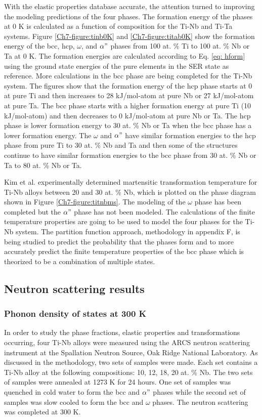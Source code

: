 With the elastic properties database accurate, the attention turned to improving the modeling predictions of the four phases. The formation energy of the phases at 0 K is calculated as a function of composition for the Ti-Nb and Ti-Ta systems. Figure \ref{Ch7-figure:tinb0K} and \ref{Ch7-figure:titab0K} show the formation energy of the bcc, hcp, $\omega$, and $\alpha"$ phases from 100 at. \% Ti to 100 at. \% Nb or Ta at 0 K. The formation energies are calculated according to Eq. \ref{eq: hform} using the ground state energies of the pure elements in the SER state as reference. More calculations in the bcc phase are being completed for the Ti-Nb system. The figures show that the formation energy of the hcp phase starts at 0 at pure Ti and then increases to 28 kJ/mol-atom at pure Nb or 27 kJ/mol-atom at pure Ta. The bcc phase starts with a higher formation energy at pure Ti (10 kJ/mol-atom) and then decreases to 0 kJ/mol-atom at pure Nb or Ta. The hcp phase is lower formation energy to 30 at. \% Nb or Ta when the bcc phase has a lower formation energy. The $\omega$ and $\alpha"$ have similar formation energies to the hcp phase from pure Ti to 30 at. \% Nb and Ta and then some of the structures continue to have similar formation energies to the bcc phase from 30 at. \% Nb or Ta to 80 at. \% Nb or Ta.

Kim et al.  \cite{Kim2006} experimentally determined martensitic transformation temperature for Ti-Nb alloys between 20 and 30 at. \% Nb, which is plotted on the phase diagram shown in Figure \ref{Ch7-figure:titnbms}. The modeling of the $\omega$ phase has been completed but the $\alpha"$ phase has not been modeled. The calculations of the finite temperature properties are going to be used to model the four phases for the Ti-Nb system. The partition function approach, methodology in appendix F, is being studied to predict the probability that the phases form and to more accurately predict the finite temperature properties of the bcc phase which is theorized to be a combination of multiple states. 

\subsection{Neutron scattering results}

\subsubsection{Phonon density of states at 300 K}

In order to study the phase fractions, elastic properties and transformations occurring, four Ti-Nb alloys were measured using the ARCS neutron scattering instrument at the Spallation Neutron Source, Oak Ridge National Laboratory. As discussed in the methodology, two sets of samples were made. Each set contains a Ti-Nb alloy at the following compositions: 10, 12, 18, 20 at. \% Nb. The two sets of samples were annealed at 1273 K for 24 hours. One set of samples was quenched in cold water to form the bcc and $\alpha"$ phases while the second set of samples was slow cooled to form the bcc and $\omega$ phases. The neutron scattering was completed at 300 K.

